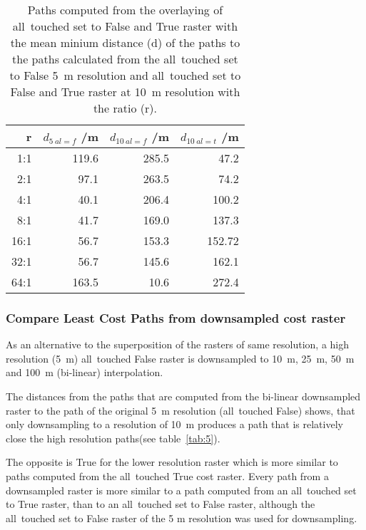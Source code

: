 \begin{table}[h!]
	\caption{Paths computed from the overlaying of all~touched set to False and True raster with the mean minium distance (d) of the paths to the paths calculated from the all~touched set to False 5~m resolution and all~touched set to False and True raster at 10~m resolution with the ratio (r).}
	\label{tab:4}
	\centering
	\begin{tabular}{ r  r  r  r}
		r & $d_{5~al=f}$ /m &  $d_{10~al=f}$ /m & $d_{10~al=t}$ /m \\
		\hline
		
		  1:1  &    119.6 &  285.5 &  47.2\\
		  2:1  &    97.1 &  263.5 &  74.2\\
		  4:1  &    40.1 &  206.4 & 100.2\\
		  8:1  &    41.7 &  169.0 & 137.3\\
		 16:1  &    56.7 &  153.3 & 152.72\\
		 32:1  &    56.7 &  145.6 & 162.1\\
		 64:1  &   163.5 &   10.6 & 272.4\\
		
	\end{tabular}
\end{table}


\subsubsection{Compare Least Cost Paths from downsampled cost raster}

As an alternative to the superposition of the rasters of same resolution, a high resolution (5~m) all~touched False raster is downsampled to 10~m, 25~m, 50~m and 100~m (bi-linear) interpolation.

The distances from the paths that are computed from the bi-linear downsampled raster to the path of the original 5~m resolution (all~touched False) shows, that only downsampling to a resolution of 10~m produces a path that is relatively close the high resolution paths(see table~\ref{tab:5}).

The opposite is True for the lower resolution raster which is more similar to paths computed from the all~touched True cost raster.
Every path from a downsampled raster is more similar to a path computed from an all~touched set to True raster, than to an all~touched set to False raster, although the all~touched set to False raster of the 5 m resolution was used for downsampling.

